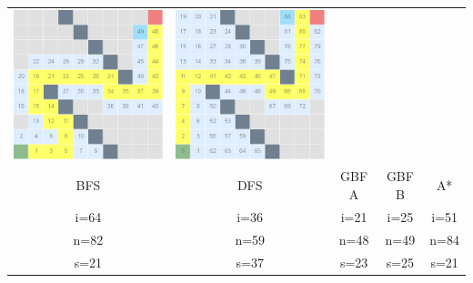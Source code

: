 \documentclass{article}
\begin{document}
\begin{center}
\begin{tabular}{c c c c c}
\includegraphics[scale=0.15]{images/scr8.png} &
\includegraphics[scale=0.15]{images/scr9.png} \\
BFS & DFS & GBF A & GBF B & A* \\
i=64 & i=36 & i=21 & i=25 & i=51 \\
n=82 & n=59 & n=48 & n=49 & n=84\\
s=21 & s=37 & s=23 & s=25 & s=21\\
\end{tabular}
\end{center}
\end{document}
